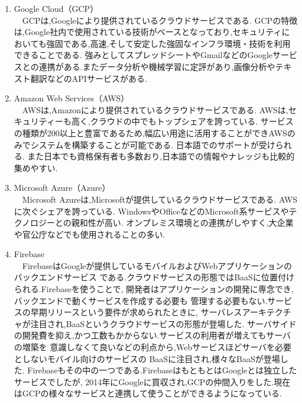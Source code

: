 \begin{enumerate}
  \item Google Cloud（GCP） \\
  　GCPは,Googleにより提供されているクラウドサービスである.
  GCPの特徴は,Google社内で使用されている技術がベースとなっており,セキュリティにおいても強固である,高速,そして安定した強固なインフラ環境・技術を利用できることである.
  強みとしてスプレッドシートやGmailなどのGoogleサービスとの連携がある.またデータ分析や機械学習に定評があり,画像分析やテキスト翻訳などのAPIサービスがある.\\

  \item Amazon Web Services（AWS） \\
  　AWSは,Amazonにより提供されているクラウドサービスである.
  AWSは,セキュリティーも高く,クラウドの中でもトップシェアを誇っている.
  サービスの種類が200以上と豊富であるため,幅広い用途に活用することができAWSのみでシステムを構築することが可能である.
  日本語でのサポートが受けられる.
  また日本でも資格保有者も多数おり,日本語での情報やナレッジも比較的集めやすい.
  \\

  \item Microsoft Azure（Azure） \\
  　Microsoft Azureは,Microsoftが提供しているクラウドサービスである.
  AWSに次ぐシェアを誇っている.
  WindowsやOfficeなどのMicrosoft系サービスやテクノロジーとの親和性が高い.
  オンプレミス環境との連携がしやすく,大企業や官公庁などでも使用されることの多い.\\

  \item  Firebase \\
  　FirebaseはGoogleが提供しているモバイルおよびWebアプリケーションのバックエンドサービス
  である.クラウドサービスの形態ではBaaSに位置付けられる.Firebaseを使うことで,
  開発者はアプリケーションの開発に専念でき,バックエンドで動くサービスを作成する必要も
  管理する必要もない.サービスの早期リリースという要件が求められたときに,
  サーバレスアーキテクチャが注目され,BaaSというクラウドサービスの形態が登場した.
  サーバサイドの開発費を抑え,かつ工数もかからない.サービスの利用者が増えてもサーバの増築を
  意識しなくて良いなどの利点から,Webサービスほどサーバを必要としないモバイル向けのサービスの
  BaaSに注目され,様々なBaaSが登場した.
  Firebaseもその中の一つである.FirebaseはもともとはGoogleとは独立したサービスでしたが,
  2014年にGoogleに買収され,GCPの仲間入りをした.現在はGCPの様々なサービスと連携して使うことができるようになっている.
\end{enumerate}

